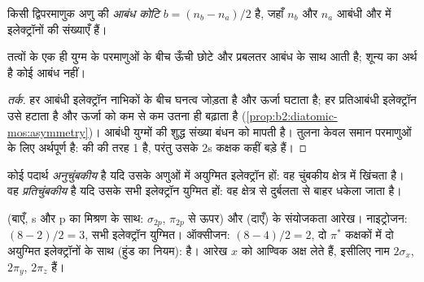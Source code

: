 \begin{definition}[आबंध कोटि]\label{def:b2:diatomic-mos:bond-order}
किसी द्विपरमाणुक अणु की \emph{आबंध कोटि} $b = (n_b -
n_a)/2$ है, जहाँ $n_b$ और $n_a$ आबंधी और  में इलेक्ट्रॉनों की
संख्याएँ हैं।
\end{definition}

\begin{proposition}[आबंध कोटि और आबंध]\label{prop:b2:diatomic-mos:bond-order}
तत्वों के एक ही युग्म के परमाणुओं के बीच ऊँची 
छोटे और प्रबलतर आबंध के साथ आती है; शून्य  का अर्थ है कोई आबंध नहीं।
\end{proposition}

\begin{proof}[तर्क]
हर आबंधी इलेक्ट्रॉन नाभिकों के बीच घनत्व जोड़ता है और ऊर्जा घटाता है;
हर प्रतिआबंधी इलेक्ट्रॉन उसे हटाता है और ऊर्जा को कम से कम उतना ही बढ़ाता है
(\cref{prop:b2:diatomic-mos:asymmetry})। आबंधी युग्मों की शुद्ध संख्या
बंधन को मापती है। तुलना केवल समान परमाणुओं के लिए अर्थपूर्ण है:  की
  की तरह 1 है, परंतु उसके 2s कक्षक कहीं बड़े हैं।
\end{proof}

\begin{definition}[अनुचुंबकीय और प्रतिचुंबकीय]\label{def:b2:diatomic-mos:magnetism}
कोई पदार्थ \emph{अनुचुंबकीय} है यदि उसके अणुओं में
अयुग्मित इलेक्ट्रॉन हों: वह चुंबकीय क्षेत्र में खिंचता है। वह
\emph{प्रतिचुंबकीय} है यदि उसके सभी इलेक्ट्रॉन युग्मित हों: वह
क्षेत्र से दुर्बलता से बाहर धकेला जाता है।
\end{definition}

\begin{omfigure}
\begin{MOdiagram}[names, labels, style=square, distance=4.2cm, labels-fs=\scriptsize]
\end{MOdiagram}
\hfill
\begin{MOdiagram}[names, labels, style=square, distance=4.2cm, labels-fs=\scriptsize]
\end{MOdiagram}

{\small {} (बाएँ, s और p का मिश्रण के साथ:
$\sigma_{2p}$, $\pi_{2p}$ से ऊपर) और  (दाएँ) के संयोजकता  आरेख। नाइट्रोजन: 
$(8 - 2)/2 = 3$, सभी इलेक्ट्रॉन युग्मित। ऑक्सीजन:  $(8 - 4)/2 = 2$, दो
$\pi^*$ कक्षकों में दो अयुग्मित इलेक्ट्रॉनों के साथ (हुंड का नियम): 
 है। आरेख $x$ को आण्विक अक्ष लेते हैं, इसीलिए नाम
$2\sigma_x$, $2\pi_y$, $2\pi_z$ हैं।}
\end{omfigure}

